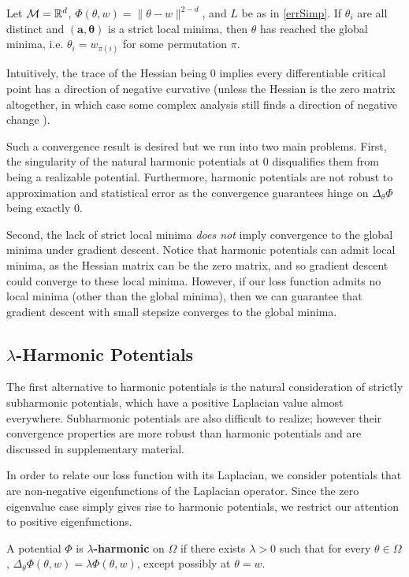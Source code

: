 \begin{corollary}
Let $\mathcal{M} = {\mathbb{R}}^d$, $\Phi(\theta,w) = \|\theta-w\|^{2-d}$, and $L$ be as in \eqref{errSimp}. If $\theta_i$ are all distinct and $(\boldsymbol{a,\theta})$ is a strict local minima, then $\theta$ has reached the global minima, i.e. $\theta_i = w_{\pi(i)}$ for some permutation $\pi$. 
\end{corollary}
\fi

Intuitively, the trace of the Hessian being 0 implies every
differentiable critical point has a direction of negative curvative
(unless the Hessian is the zero matrix altogether, in which case some
complex analysis still finds a direction of negative change
\cite{arnold1985mathematical}). 

Such a convergence result is desired but we run into two main problems. First, the singularity of the natural harmonic potentials at $0$ disqualifies them from being a realizable potential. Furthermore, harmonic potentials are not robust to approximation and statistical error as the convergence guarantees hinge on $\Delta_\theta\Phi$ being exactly 0. 

Second, the lack of strict local minima {\it does not} imply
convergence to the global minima under gradient descent. Notice that
harmonic potentials can admit local minima, as the Hessian matrix can
be the zero matrix, and so gradient descent could converge to these
local minima. However, if our loss function admits no local minima
(other than the global minima), then we can guarantee that gradient
descent with small stepsize converges to the global minima.

\subsection{$\lambda$-Harmonic Potentials}

The first alternative to harmonic potentials is the natural
consideration of strictly subharmonic potentials, which have a
positive Laplacian value almost everywhere. Subharmonic potentials are
also difficult to realize; however their convergence properties are
more robust than harmonic potentials and are discussed in supplementary material. 

%
In order to relate our loss function with its Laplacian, we consider potentials that are non-negative eigenfunctions of the Laplacian operator. Since the zero eigenvalue case simply gives rise to harmonic potentials, we restrict our attention to positive eigenfunctions.
%
\begin{definition}
A potential $\Phi$ is {\bf$\lambda$-harmonic} on $\Omega$ if there exists $\lambda > 0$ such that for every $\theta \in \Omega$, $\Delta_\theta \Phi(\theta, w) = \lambda \Phi(\theta,w) $, except possibly at $\theta = w$.
\end{definition}

